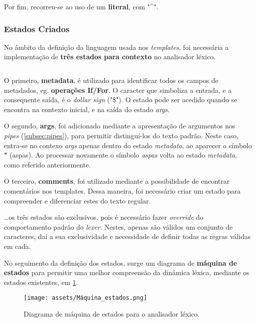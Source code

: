 \documentclass[../relatorio.tex]{subfiles}
\begin{document}
    Por fim, recorreu-se ao uso de um \textbf{literal}, com "\^{}".

    \subsubsection{Estados Criados}
    No âmbito da definição da linguagem usada nos \textit{templates},
    foi necessária a implementação de \textbf{três estados para contexto} no
    analisador léxico.

    \inputminted[firstline=13, lastline=17]{python}{../pandoc_lex.py}

    O primeiro, \textbf{metadata}, é utilizado para identificar todos os
    campos de metadados, eg. \textbf{operações If/For}.
    O caracter que simboliza a entrada, e a consequente saída, é o 
    \textit{dollar sign} ("\$").
    O estado pode ser acedido quando se encontra na contexto inicial, e
    na saída do estado \textit{args}.

    O segundo, \textbf{args}, foi adicionado mediante a apresentação 
    de argumentos nos \textit{pipes} (\ref{subsec:pipes}), para permitir 
    distinguí-los do texto padrão. 
    Neste caso, entra-se no contexo \textit{args} apenas dentro do 
    estado \textit{metadata}, ao aparecer o símbolo \textbf{"} (aspas).
    Ao processar novamente o símbolo \textit{aspas} volta ao estado \textit{metadata},
    como referido anteriormente.

    O terceiro, \textbf{comments}, foi utilizado mediante a possibilidade de 
    encontrar comentários nos templates. Dessa maneira, foi necessário criar um 
    estado para compreender e diferenciar estes do texto regular.

    \dots os três estados são exclusivos, pois é necessário fazer \textit{override}
    do comportamento padrão do \textit{lexer}.
    Nestes, apenas são válidos um conjunto de caracteres, daí a sua exclusividade e 
    necessidade de definir todas as regras válidas em cada.

    No seguimento da definição dos estados, surge um diagrama de 
    \textbf{máquina de estados} para permitir uma melhor compreensão da
    dinâmica léxica, mediante os estados existentes, em \ref{fig:state_machine}.

    \begin{figure}[!ht]
        \centering
        \texttt{[image: assets/Máquina\_estados.png]}
        \caption{Diagrama de máquina de estados para o analisador léxico.}
        \label{fig:state_machine}
    \end{figure}
\end{document}
